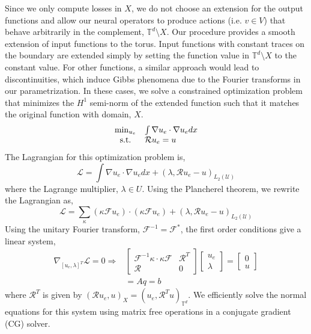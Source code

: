 Since we only compute losses in $X$, we do not choose an extension for the output functions and allow our neural operators to produce actions (i.e. $v \in V$) that behave arbitrarily in the complement, $\mathbb{T}^d \setminus X$. Our procedure provides a smooth extension of input functions to the torus. Input functions with constant traces on the boundary are extended simply by setting the function value in $\mathbb{T}^d \setminus X$ to the constant value. For other functions, a similar approach would lead to discontinuities, which induce Gibbs phenomena due to the Fourier transforms in our parametrization.
In these cases, we solve a constrained optimization problem that minimizes the $H^1$ semi-norm of the extended function such that it matches the original function with domain, $X$.
%
\begin{equation}
\begin{matrix}
    \min_{u_e} & \int \nabla u_e \cdot \nabla u_e  dx \\
    \mathrm{s.t.}  & \mathcal{R} u_e = u \hfill
\end{matrix}
\end{equation}
%
The Lagrangian \cite{bertsekas2014constrained} for this optimization problem is,
\begin{equation}
    \mathcal{L} = \int \nabla u_e \cdot \nabla u_e  dx + (\lambda, \mathcal{R} u_e - u)_{L_2(\mathcal{U})}
\end{equation}
where the Lagrange multiplier, $\lambda \in {U}$. Using the Plancherel theorem, we rewrite the Lagrangian as,
\begin{equation}
    \mathcal{L} = \sum_\kappa (\kappa \mathcal{F} u_e) \cdot (\kappa \mathcal{F} u_e)  + (\lambda, \mathcal{R} u_e - u)_{L_2(\mathcal{U})}
\end{equation}
Using the unitary Fourier transform, $\mathcal{F}^{-1} = \mathcal{F}^*$, the first order conditions give a linear system,
\begin{equation}\label{eq:smooth_ext}
\begin{aligned}
\nabla_{[u_e,\lambda]^T} \mathcal{L} =0 \Rightarrow
    &\begin{bmatrix}
        \mathcal{F}^{-1} {\kappa \cdot \kappa} \mathcal{F} & \mathcal{R}^T \\
        \mathcal{R} & 0
    \end{bmatrix}
        \begin{bmatrix}
        u_e \\
        \lambda
    \end{bmatrix}
    =
        \begin{bmatrix}
        0 \\
        u
    \end{bmatrix}\\
    &=A q = b
\end{aligned}
\end{equation}
where $\mathcal{R}^T$ is given by $(\mathcal{R}u_e,u)_X=(u_e,\mathcal{R}^Tu)_{\mathbb{T}^d}$. We efficiently solve the normal equations for this system using matrix free operations in a conjugate gradient (CG) solver. 

